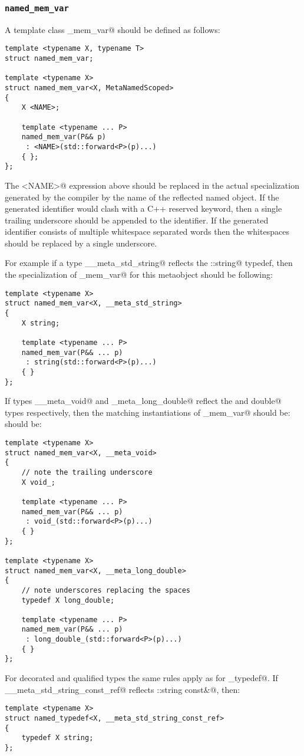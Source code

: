 \subsubsection{\texttt{named\_mem\_var}}

A template class \verb@named_mem_var@ should be defined as follows:

\begin{verbatim}
template <typename X, typename T>
struct named_mem_var;

template <typename X>
struct named_mem_var<X, MetaNamedScoped>
{
	X <NAME>;

	template <typename ... P>
	named_mem_var(P&& p)
	 : <NAME>(std::forward<P>(p)...)
	{ };
};
\end{verbatim}

The \verb@<NAME>@ expression above should be replaced in the actual specialization generated by the compiler
by the name of the reflected named object. If the generated identifier would clash with a C++
reserved keyword, then a single trailing underscore should be appended to the identifier.
If the generated identifier consists of multiple whitespace separated words then the whitespaces
should be replaced by a single underscore.

For example if a type \verb@__meta_std_string@
reflects the \verb@std::string@ typedef, then the specialization of \verb@named_mem_var@
for this metaobject should be following:

\begin{verbatim}
template <typename X>
struct named_mem_var<X, __meta_std_string>
{
	X string;

	template <typename ... P>
	named_mem_var(P&& ... p)
	 : string(std::forward<P>(p)...)
	{ }
};
\end{verbatim}

If types \verb@__meta_void@ and \verb@_meta_long_double@ reflect the \verb@void@ and \verb@long double@
types respectively, then the matching instantiations of \verb@named_mem_var@ should be:
should be:

\begin{verbatim}
template <typename X>
struct named_mem_var<X, __meta_void>
{
	// note the trailing underscore
	X void_;

	template <typename ... P>
	named_mem_var(P&& ... p)
	 : void_(std::forward<P>(p)...)
	{ }
};

template <typename X>
struct named_mem_var<X, __meta_long_double>
{
	// note underscores replacing the spaces
	typedef X long_double;

	template <typename ... P>
	named_mem_var(P&& ... p)
	 : long_double_(std::forward<P>(p)...)
	{ }
};
\end{verbatim}

For decorated and qualified types the same rules apply as for \verb@named_typedef@.
If \verb@__meta_std_string_const_ref@ reflects \verb@std::string const&@, then:

\begin{verbatim}
template <typename X>
struct named_typedef<X, __meta_std_string_const_ref>
{
	typedef X string;
};
\end{verbatim}

